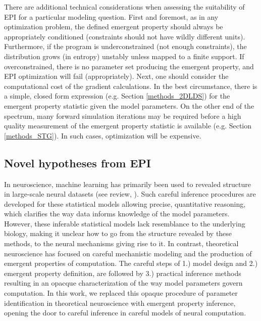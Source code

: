 \documentclass[11pt]{article}
\begin{document}
There are additional technical considerations when assessing the suitability of EPI for a particular modeling question.  
First and foremost, as in any optimization problem, the defined emergent property should always be appropriately conditioned (constraints should not have wildly different units).  
Furthermore, if the program is underconstrained (not enough constraints), the distribution grows (in entropy) unstably unless mapped to a finite support.  
If overconstrained, there is no parameter set producing the emergent property, and EPI optimization will fail (appropriately).
Next, one should consider the computational cost of the gradient calculations. 
In the best circumstance, there is a simple, closed form expression (e.g. Section \ref{methods_2DLDS}) for the emergent property statistic given the model parameters.  
On the other end of the spectrum, many forward simulation iterations may be required before a high quality measurement of the emergent property statistic is available  (e.g. Section \ref{methods_STG}).  In such cases, optimization will be expensive.

\subsection{Novel hypotheses from EPI} 
In neuroscience, machine learning has primarily been used to revealed structure in large-scale neural datasets \cite{kass2001spike, brown1998statistical, paninski2004maximum, byron2009gaussian, latimer2015single, duncker2019learning} (see review, \cite{paninski2018neural}).  Such careful inference procedures are developed for these statistical models allowing precise, quantitative reasoning, which clarifies the way data informs knowledge of the model parameters.  However, these inferable statistical models lack resemblance to the underlying biology, making it unclear how to go from the structure revealed by these methods, to the neural mechanisms giving rise to it.  In contrast, theoretical neuroscience has focused on careful mechanistic modeling and the production of emergent properties of computation.  The careful steps of 1.) model design and 2.) emergent property definition, are followed by 3.) practical inference methods resulting in an opacque characterization of the way model parameters govern computation.  In this work, we replaced this opaque procedure of parameter identification in theoretical neuroscience with emergent property inference, opening the door to careful inference in careful models of neural computation.
\end{document}
